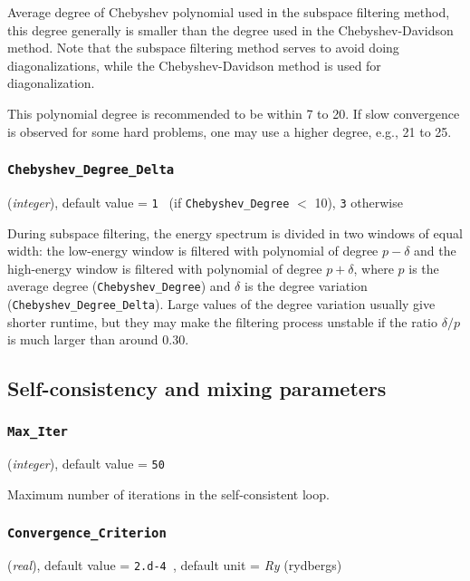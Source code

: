 \documentclass{article}
\begin{document}
Average degree of Chebyshev polynomial used in the subspace filtering
method, this degree generally is smaller than the degree used
in the Chebyshev-Davidson method. 
Note that the subspace filtering method serves to avoid 
doing diagonalizations, while the Chebyshev-Davidson method is
used for diagonalization. 

This  polynomial degree is recommended to be within 7 to 20.  
If slow convergence is observed for some hard problems, 
one may use a higher degree, e.g., 21 to 25.

\subsubsection{\tt Chebyshev\_Degree\_Delta
\label{ChebyshevDegreeDelta}}
({\it integer}),
default value = {\tt 1 } (if {\tt Chebyshev\_Degree} $<$ 10), {\tt 3} otherwise

During subspace filtering, the energy spectrum is divided in two windows of
equal width: the low-energy window is filtered with polynomial of degree
$p-\delta$ and the high-energy window is filtered with polynomial of degree
$p+\delta$, where $p$ is the average degree ({\tt Chebyshev\_Degree}) and
$\delta$ is the degree variation ({\tt Chebyshev\_Degree\_Delta}). Large
values of the degree variation usually give shorter runtime, but they may
make the filtering process unstable if the ratio $\delta/p$ is much larger
than around 0.30.


\subsection{Self-consistency and mixing parameters}

\subsubsection{\tt Max\_Iter 
\label{MaxIter}}
({\it integer}),
default value = {\tt 50 }

Maximum number of iterations in the self-consistent loop.

\subsubsection{\tt Convergence\_Criterion 
\label{ConvergenceCriterion}}
({\it real}),
default value = {\tt 2.d-4 },
default unit = {\it Ry} (rydbergs)
\end{document}
